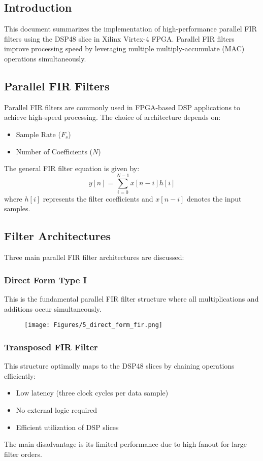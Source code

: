 \documentclass{article}
\begin{document}
	\subsection{Introduction}
	This document summarizes the implementation of high-performance parallel FIR filters using the DSP48 slice in Xilinx Virtex-4 FPGA. Parallel FIR filters improve processing speed by leveraging multiple multiply-accumulate (MAC) operations simultaneously.
	
	\subsection{Parallel FIR Filters}
	Parallel FIR filters are commonly used in FPGA-based DSP applications to achieve high-speed processing. The choice of architecture depends on:
	\begin{itemize}
		\item Sample Rate ($F_s$)
		\item Number of Coefficients ($N$)
	\end{itemize}
	The general FIR filter equation is given by:
	\begin{equation}
		y[n] = \sum_{i=0}^{N-1} x[n-i] h[i]
	\end{equation}
	where $h[i]$ represents the filter coefficients and $x[n-i]$ denotes the input samples.
	
	\subsection{Filter Architectures}
	Three main parallel FIR filter architectures are discussed:
	
	\subsubsection{Direct Form Type I}
	This is the fundamental parallel FIR filter structure where all multiplications and additions occur simultaneously.
	
	\newpage
	
	\begin{figure}
		\centering
		\texttt{[image: Figures/5\_direct\_form\_fir.png]}
		\label{fig:enter-label}
	\end{figure}
	
	\subsubsection{Transposed FIR Filter}
	This structure optimally maps to the DSP48 slices by chaining operations efficiently:
	\begin{itemize}
		\item Low latency (three clock cycles per data sample)
		\item No external logic required
		\item Efficient utilization of DSP slices
	\end{itemize}
	The main disadvantage is its limited performance due to high fanout for large filter orders.
	
\end{document}
